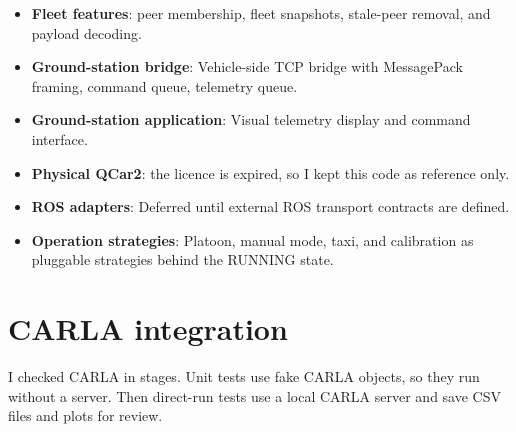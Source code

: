 \documentclass[11pt,a4paper]{article}
\begin{document}
\begin{itemize}[leftmargin=*]
    \item \textbf{Fleet features}: peer membership, fleet snapshots, stale-peer removal, and payload decoding.
    \item \textbf{Ground-station bridge}: Vehicle-side TCP bridge with MessagePack framing, command queue, telemetry queue.
    \item \textbf{Ground-station application}: Visual telemetry display and command interface.
    \item \textbf{Physical QCar2}: the licence is expired, so I kept this code as reference only.
    \item \textbf{ROS adapters}: Deferred until external ROS transport contracts are defined.
    \item \textbf{Operation strategies}: Platoon, manual mode, taxi, and calibration as pluggable strategies behind the RUNNING state.
\end{itemize}

\section{CARLA integration}

I checked CARLA in stages. Unit tests use fake CARLA objects, so they run without a server. Then direct-run tests use a local CARLA server and save CSV files and plots for review.
\end{document}
